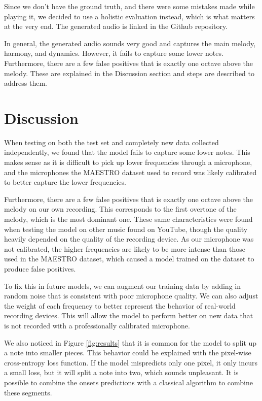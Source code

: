 \documentclass[a4paper,twocolumn,10pt]{article}
\begin{document}
Since we don't have the ground truth, and there were some mistakes made while playing it, we decided to use a holistic evaluation instead, which is what matters at the very end. The generated audio is linked in the Github repository.

In general, the generated audio sounds very good and captures the main melody, harmony, and dynamics. However, it fails to capture some lower notes. Furthermore, there are a few false positives that is exactly one octave above the melody. These are explained in the Discussion section and steps are described to address them.

\section{Discussion}
When testing on both the test set and completely new data collected independently, we found that the model fails to capture some lower notes. This makes sense as it is difficult to pick up lower frequencies through a microphone, and the microphones the MAESTRO dataset used to record was likely calibrated to better capture the lower frequencies.

Furthermore, there are a few false positives that is exactly one octave above the melody on our own recording. This corresponds to the first overtone of the melody, which is the most dominant one. These same characteristics were found when testing the model on other music found on YouTube, though the quality heavily depended on the quality of the recording device. As our microphone was not calibrated, the higher frequencies are likely to be more intense than those used in the MAESTRO dataset, which caused a model trained on the dataset to produce false positives.

To fix this in future models, we can augment our training data by adding in random noise that is consistent with poor microphone quality. We can also adjust the weight of each frequency to better represent the behavior of real-world recording devices. This will allow the model to perform better on new data that is not recorded with a professionally calibrated microphone.

We also noticed in Figure \ref{fig:results} that it is common for the model to split up a note into smaller pieces. This behavior could be explained with the pixel-wise cross-entropy loss function. If the model mispredicts only one pixel, it only incurs a small loss, but it will split a note into two, which sounds unpleasant. It is possible to combine the onsets predictions with a classical algorithm to combine these segments.
\end{document}

